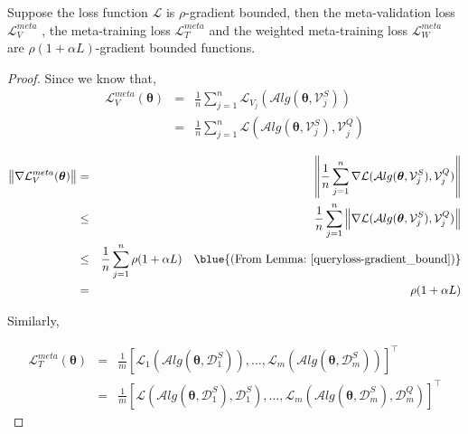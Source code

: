 \begin{lemma} \label{meta-gradient_bound}
Suppose the loss function $\mathcal{L}$ is $\rho$-gradient bounded, then the meta-validation loss $\mathcal{L}_V^{meta}$ , the meta-training loss $\mathcal{L}_T^{meta}$ and the weighted meta-training loss $\mathcal{L}_W^{meta}$  are $\rho(1+\alpha L)$-gradient bounded functions.
\end{lemma}
\begin{proof}
Since we know that,
\begin{eqnarray}
    \mathcal{L}_{V}^{meta}(\boldsymbol{\theta}) &=& \frac{1}{n}\sum_{j=1}^{n}\mathcal{L}_{V_j}(\mathcal{A}lg(\boldsymbol{\theta},\mathcal{V}_j^{S})) \nonumber\\
    &=&\frac{1}{n}\sum_{j=1}^{n}\mathcal{L}(\mathcal{A}lg(\boldsymbol{\theta},\mathcal{V}_j^{S}), \mathcal{V}_j^{Q})  \nonumber
\end{eqnarray}

\begin{eqnarray}
    \left\Vert\nabla\mathcal{L}_{V}^{meta}(\boldsymbol{\theta})\right\Vert 
    &=&\left\Vert\frac{1}{n}\sum_{j=1}^{n}\nabla\mathcal{L}(\mathcal{A}lg(\boldsymbol{\theta},\mathcal{V}_j^{S}), \mathcal{V}_j^{Q})\right\Vert \nonumber \\
    &\leq&\frac{1}{n}\sum_{j=1}^{n}\left\Vert\nabla\mathcal{L}(\mathcal{A}lg(\boldsymbol{\theta},\mathcal{V}_j^{S}), \mathcal{V}_j^{Q})\right\Vert \nonumber \\
    &\leq&\frac{1}{n}\sum_{j=1}^{n}\rho(1+\alpha L) \quad \blue{\text{(From Lemma:~\ref{queryloss-gradient_bound})}}\nonumber \\
    &=&\rho(1+\alpha L)
\end{eqnarray}

Similarly, 

\begin{eqnarray}
   {\mathcal{L}}_{T}^{meta}(\boldsymbol{\theta}) &=& \frac{1}{m}[\mathcal{L}_{1}(\mathcal{A}lg(\boldsymbol{\theta},\mathcal{D}_1^{S})), \dots, \mathcal{L}_{m}(\mathcal{A}lg(\boldsymbol{\theta},\mathcal{D}_m^{S}))]^{\intercal} \nonumber \\
   &=& \frac{1}{m}[\mathcal{L}(\mathcal{A}lg(\boldsymbol{\theta},\mathcal{D}_1^{S}), \mathcal{D}_1^{S}), \dots, \mathcal{L}_{m}(\mathcal{A}lg(\boldsymbol{\theta},\mathcal{D}_m^{S}), \mathcal{D}_m^{Q})]^{\intercal}
\end{eqnarray}


\end{proof}

